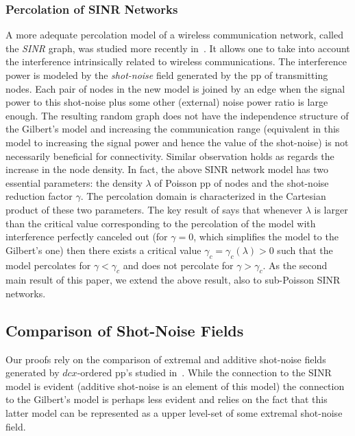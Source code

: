 \documentclass[conference]{IEEEtran}
\begin{document}
\subsubsection{Percolation of SINR Networks}
A more adequate percolation model of a wireless communication network,
called the {\em SINR} graph,
was studied more recently in~\cite{Dousse_etal_TON,Dousse_etal}. It allows 
one to take into account the interference intrinsically related to
wireless communications.
The interference power is modeled by the {\em
shot-noise} field generated by the pp 
of transmitting nodes. Each pair of nodes 
in the new model is joined by an edge when  the signal
power to this shot-noise plus some other (external) noise power ratio 
is large enough. 
The resulting  random graph does not have the independence structure 
of the Gilbert's  model and increasing the communication range
(equivalent in this model to increasing the signal power and
hence the value of the shot-noise) is not necessarily 
beneficial for connectivity. Similar observation holds as regards the
increase in the node density. 
In fact, the above SINR network model has two essential parameters: 
the density   $\lambda$ of Poisson pp of nodes and the   
shot-noise reduction factor $\gamma$. The percolation domain is characterized 
in the Cartesian product of these two parameters. 
The key result of \cite{Dousse_etal} says that whenever $\lambda$ is larger than the 
critical value corresponding to the percolation of the model with interference perfectly
canceled out (for $\gamma=0$, which simplifies the model to
the Gilbert's one) then there exists a critical value
$\gamma_c=\gamma_c(\lambda)>0$ such that the model
percolates for $\gamma<\gamma_c$ and does not percolate for
$\gamma>\gamma_c$. As the second main result of this paper, we  extend
the above result, also  to sub-Poisson SINR networks. 

\subsection{Comparison of Shot-Noise Fields}
Our proofs rely on the comparison of extremal and additive shot-noise
fields generated by $dcx$-ordered pp's studied
in~\cite{snorder}. While the connection to the SINR model is evident
(additive shot-noise is an element of this model) the 
connection to the Gilbert's model is perhaps less evident and relies
on the fact that this latter model  can be represented as a upper level-set 
of some extremal shot-noise field.
\end{document}
